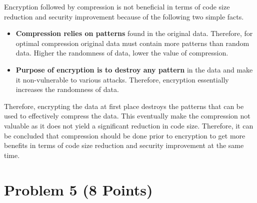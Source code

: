 \documentclass[11pt,letterpaper]{article}
\begin{document}
	Encryption followed by compression is not beneficial in terms of code size reduction and security improvement because of the following two simple facts.
	
	\begin{itemize}
		\item \textbf{Compression relies on patterns} found in the original data. Therefore, for optimal compression original data must contain more patterns than random data. Higher the randomness of data, lower the value of compression.
		
		\item \textbf{Purpose of encryption is to destroy any pattern} in the data and make it non-vulnerable to various attacks. Therefore, encryption essentially increases the randomness of data.
		
	\end{itemize}

	Therefore, encrypting the data at first place destroys the patterns that can be used to effectively compress the data. This eventually make the compression not valuable as it does not yield a significant reduction in code size. Therefore, it can be concluded that compression should be done prior to encryption  to get more benefits in terms of code size reduction and security improvement at the same time.
	
	
	
	
	\pagebreak
	\section*{Problem 5 (8 Points)}
	
\end{document}
